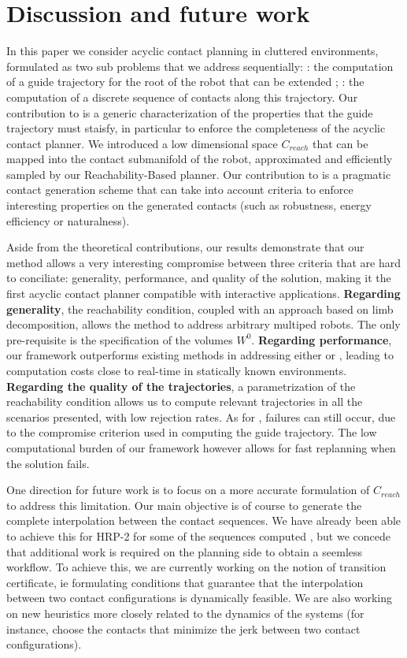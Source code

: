  \section{Discussion and future work} 
\label{sec:conclusion}

In this paper we consider acyclic contact planning in cluttered environments, formulated as two sub problems that we address sequentially:
\Pa: the computation of a guide trajectory for the root of the robot that can be extended ; \Pb: the computation
of a discrete sequence of contacts along this trajectory.
Our contribution to \Pa is a generic characterization of the properties that the guide trajectory must staisfy, in particular to enforce the completeness of the acyclic contact planner. We introduced a low dimensional space  $C_{reach}$ that can be mapped 
into the contact submanifold of the robot, approximated and efficiently sampled by our Reachability-Based planner.
Our contribution to \Pb is a pragmatic contact generation scheme that can take into
account criteria to enforce interesting properties on the generated contacts (such as robustness, energy efficiency or naturalness).

Aside from the theoretical contributions, our results demonstrate that our method allows a very interesting compromise between three 
criteria that are hard to conciliate: generality, performance, and quality of the solution, making it the first acyclic contact
planner compatible with interactive applications.
%
\textbf{Regarding generality}, the reachability condition, coupled with an approach based on limb decomposition, 
allows the method to address arbitrary multiped robots. The only pre-requisite is the specification 
of the volumes $W^0$.
%
\textbf{Regarding performance}, our framework outperforms existing methods in addressing either \Pa or \Pb, leading to computation costs close to real-time in
statically known environments.
%
\textbf{Regarding the quality of the trajectories}, a parametrization of the reachability condition allows us to compute
relevant trajectories in all the scenarios presented, with low rejection rates.
As for \cite{Bouyarmane2009}, failures can still occur, due to the compromise criterion used in computing the guide trajectory.
The low computational burden of our framework however allows for fast replanning when the solution fails.

One direction for future work is to focus on a more accurate formulation of $C_{reach}$ to address 
this limitation.
Our main objective is of course to generate the complete interpolation between the contact sequences.
We have already been able to achieve this for HRP-2 for some of the sequences computed \citep{Carpentier2016}, but we concede that additional
work is required on the planning side to obtain a seemless workflow. To achieve this, we are currently working on the notion of transition certificate, ie formulating
conditions that guarantee that the interpolation between two contact configurations is dynamically feasible. We are also
working on new heuristics more closely related to the dynamics of the systems (for instance, choose the contacts that minimize the jerk between two contact configurations).



